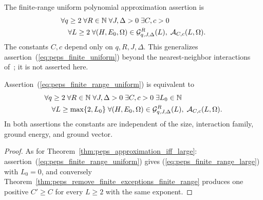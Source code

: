 \begin{definition}
    \label{def:peps_finite_range_uniform_target}
    \leanok
    The finite-range uniform polynomial approximation assertion is
    \begin{align}
         & \forall q\ge2\;\forall R\in\mathbb N\;\forall J,\Delta>0\;
        \exists C,c>0\;\label{eq:peps_finite_range_uniform}           \\
         & \quad\forall L\ge2\;
        \forall(H,E_0,\Omega)\in\mathcal G^{R}_{q,J,\Delta}(L),\;
        \mathcal A_{C,c}(L,\Omega).\notag
    \end{align}
    The constants $C,c$ depend only on $q,R,J,\Delta$. This generalizes
    assertion~(\ref{eq:peps_finite_uniform}) beyond the nearest-neighbor
    interactions of~\cite[Theorem~1.1]{OpenAI2026PolynomialPEPS}; it is not
    asserted here.
\end{definition}

\begin{theorem}
    \label{thm:peps_finite_range_approximation_iff_large}
    \leanok
    Assertion~(\ref{eq:peps_finite_range_uniform}) is equivalent to
    \begin{align}
         & \forall q\ge2\;\forall R\in\mathbb N\;\forall J,\Delta>0\;
        \exists C,c>0\;\exists L_0\in\mathbb N\;
        \label{eq:peps_finite_range_large}                            \\
         & \quad\forall L\ge\max\{2,L_0\}\;
        \forall(H,E_0,\Omega)\in\mathcal G^{R}_{q,J,\Delta}(L),\;
        \mathcal A_{C,c}(L,\Omega).\notag
    \end{align}
    In both assertions the constants are independent of the size,
    interaction family, ground energy, and ground vector.
\end{theorem}
\begin{proof}
    \leanok
    As for Theorem~\ref{thm:peps_approximation_iff_large}:
    assertion~(\ref{eq:peps_finite_range_uniform}) gives
    (\ref{eq:peps_finite_range_large}) with $L_0=0$, and conversely
    Theorem~\ref{thm:peps_remove_finite_exceptions_finite_range} produces one
    positive $C'\ge C$ for every $L\ge2$ with the same exponent.
\end{proof}

